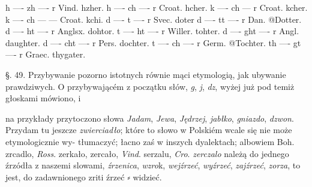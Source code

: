 
h  —-  zh  —- r  Vind. hzher.
h  —-  ch  —- r  Croat. hcher.
k  —-  ch  — r  Croat. kcher.
k  —-  ch  — —  Croat. kchi.
d  —-  t  —- r  Svec. doter
d  —-  tt  —- r  Dan. @{Dotter}.
d  —-  ht  —- r  Anglsx. dohtor.
t  —-  ht  —- r  Willer. tohter.
d  —-  ght  —-   r  Angl. daughter.
d  —-  cht  —- r  Pers. dochter.
t  —-  ch  —- r  Germ. @{Tochter}.
 th  —- gt  —- r  Graec. thygater.



§. 49.
Przybywanie pozorno istotnych równie mąci etymologią,
jak ubywanie prawdziwych. O przybywającém z początku
słów, \textit{g}, \textit{j}, \textit{dz}, wyżej już pod temiż głoskami mówiono, i

na przykłady przytoczono słowa \textit{Jadam}, \textit{Jewa}, \textit{Jędrzej},\textit{ jabłko},
\textit{gniazdo}, \textit{dzwon}. Przydam tu jeszcze \textit{zwierciadło}; które to
słowo w Polskiém wcale się nie może etymologicznie wy-
tłumaczyć; łacno zaś w inszych dyalektach; albowiem {Boh}.
zrcadlo, \textit{Ross}. zerkało, zercało, \textit{Vind}. serzalu, \textit{Cro}. \textit{zerczalo}
należą do jednego źrzódła z naszemi slowami,\textit{ źrzenica}, \textit{wzro}k,
\textit{wejźrzeć}, \textit{wyźrzeć}, \textit{zajźrzeć}, \textit{zorza}, to jest, do zadawnionego
zriti źrzeć ⸗ widzieć.


